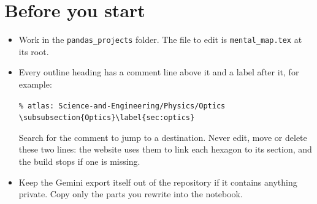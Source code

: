\documentclass[11pt]{article}
\begin{document}
\section{Before you start}
\begin{itemize}
\item Work in the \texttt{pandas\_projects} folder. The file to edit is \texttt{mental\_map.tex} at its root.
\item Every outline heading has a comment line above it and a label after it, for example:
\begin{center}
\texttt{\% atlas: Science-and-Engineering/Physics/Optics}\\
\texttt{\textbackslash subsubsection\{Optics\}\textbackslash label\{sec:optics\}}
\end{center}
Search for the comment to jump to a destination. Never edit, move or delete these two lines: the website uses them to link each hexagon to its section, and the build stops if one is missing.
\item Keep the Gemini export itself out of the repository if it contains anything private. Copy only the parts you rewrite into the notebook.
\end{itemize}
\end{document}
